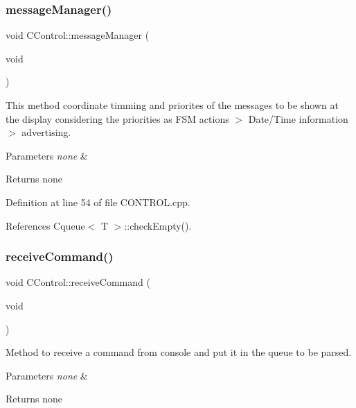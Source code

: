 \subsubsection{\texorpdfstring{message\+Manager()}{messageManager()}}
{\footnotesize\ttfamily void C\+Control\+::message\+Manager (\begin{DoxyParamCaption}\item[{void}]{ }\end{DoxyParamCaption})}



This method coordinate timming and priorites of the messages to be shown at the display considering the priorities as F\+SM actions $>$ Date/\+Time information $>$ advertising. 


\begin{DoxyParams}{Parameters}
{\em none} & \\
\hline
\end{DoxyParams}
\begin{DoxyReturn}{Returns}
none 
\end{DoxyReturn}


Definition at line 54 of file C\+O\+N\+T\+R\+O\+L.\+cpp.



References Cqueue$<$ T $>$\+::check\+Empty().

\mbox{\label{class_c_control_ab698c7d1945864d1f5c35e091de1ab22}} 
\subsubsection{\texorpdfstring{receive\+Command()}{receiveCommand()}}
{\footnotesize\ttfamily void C\+Control\+::receive\+Command (\begin{DoxyParamCaption}\item[{void}]{ }\end{DoxyParamCaption})}



Method to receive a command from console and put it in the queue to be parsed. 


\begin{DoxyParams}{Parameters}
{\em none} & \\
\hline
\end{DoxyParams}
\begin{DoxyReturn}{Returns}
none 
\end{DoxyReturn}


